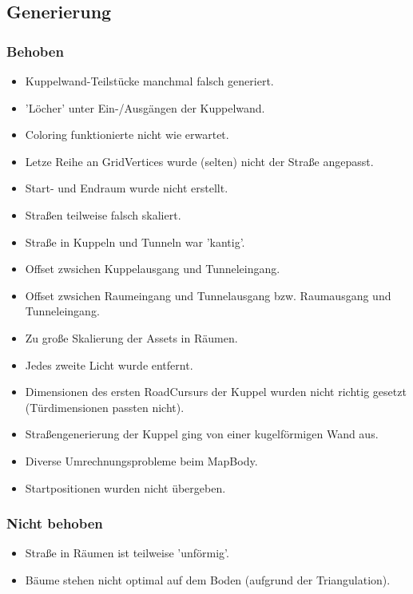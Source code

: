 \subsection{Generierung}
\subsubsection{Behoben}
\begin{itemize}
    \item Kuppelwand-Teilstücke manchmal falsch generiert.
    \item 'Löcher' unter Ein-/Ausgängen der Kuppelwand.
    \item Coloring funktionierte nicht wie erwartet.
    \item Letze Reihe an GridVertices wurde (selten) nicht der Straße angepasst.
    \item Start- und Endraum wurde nicht erstellt.
    \item Straßen teilweise falsch skaliert.
    \item Straße in Kuppeln und Tunneln war 'kantig'.
    \item Offset zwsichen Kuppelausgang und Tunneleingang.
    \item Offset zwsichen Raumeingang und Tunnelausgang bzw. Raumausgang und Tunneleingang.
    \item Zu große Skalierung der Assets in Räumen.
    \item Jedes zweite Licht wurde entfernt.
    \item Dimensionen des ersten RoadCursurs der Kuppel wurden nicht richtig gesetzt (Türdimensionen passten nicht).
    \item Straßengenerierung der Kuppel ging von einer kugelförmigen Wand aus.
    \item Diverse Umrechnungsprobleme beim MapBody.
    \item Startpositionen wurden nicht übergeben.
\end{itemize}

\subsubsection{Nicht behoben}
\begin{itemize}
    \item Straße in Räumen ist teilweise 'unförmig'.
    \item Bäume stehen nicht optimal auf dem Boden (aufgrund der Triangulation).
\end{itemize}